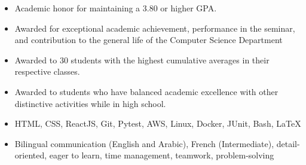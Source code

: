\documentclass[10pt,a4paper,ragged2e]{altacv}
\begin{document}
\begin{itemize}
  \item Academic honor for maintaining a 3.80 or higher GPA.
\end{itemize}
\smallskip
{}
\begin{itemize}
  \item Awarded for exceptional academic achievement, performance in the seminar, and contribution to the general life of the Computer Science Department
\end{itemize}
\smallskip
{}
\begin{itemize}
  \item Awarded to 30 students with the highest cumulative averages in their respective classes.
\end{itemize}
\smallskip
{}
\begin{itemize}
  \item Awarded to students who have balanced academic excellence with other distinctive activities while in high school.
\end{itemize}
\smallskip


\smallskip
\smallskip
{}
\begin{itemize}
  \item HTML, CSS, ReactJS, Git, Pytest, AWS, Linux, Docker, JUnit, Bash, \LaTeX
\end{itemize}
\smallskip
{}
\begin{itemize}
  \item Bilingual communication (English and Arabic), French (Intermediate), detail-oriented, eager to learn, time management, teamwork, problem-solving
\end{itemize}








\end{document}
